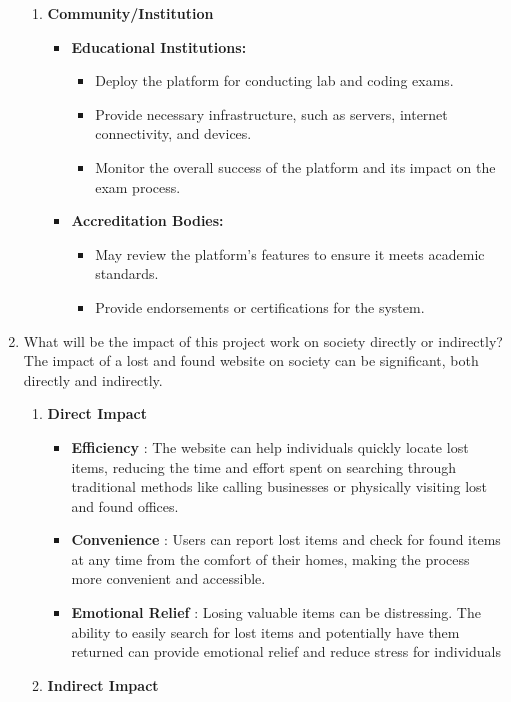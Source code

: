 \documentclass[14pt]{article}
\begin{document}
\begin{enumerate}
\begin{enumerate}
    \item \textbf{Community/Institution}
    \begin{itemize}
        \item \textbf{Educational Institutions:}
        \begin{itemize}
            \item Deploy the platform for conducting lab and coding exams.
            \item Provide necessary infrastructure, such as servers, internet connectivity, and devices.
            \item Monitor the overall success of the platform and its impact on the exam process.
        \end{itemize}
        \item \textbf{Accreditation Bodies:}
        \begin{itemize}
            \item May review the platform’s features to ensure it meets academic standards.
            \item Provide endorsements or certifications for the system.
        \end{itemize}
    \end{itemize}
\end{enumerate}
\item What will be the impact of this project work on society directly or indirectly?\\
\tabto{.5cm}The impact of a lost and found website on society can be significant, both directly
and indirectly.
\begin{enumerate}
\item \textbf{Direct Impact}
\begin{itemize}
\item \textbf{Efficiency} : The website can help individuals quickly locate lost items,
reducing the time and effort spent on searching through traditional methods like calling businesses or physically visiting lost and found offices.
\item \textbf{Convenience} : Users can report lost items and check for found items at any
time from the comfort of their homes, making the process more convenient
and accessible.
\item \textbf{Emotional Relief} : Losing valuable items can be distressing. The ability to
easily search for lost items and potentially have them returned can provide emotional relief and reduce stress for individuals
\end{itemize}
\item \textbf{Indirect Impact}

\end{enumerate}
\end{enumerate}
\end{document}
